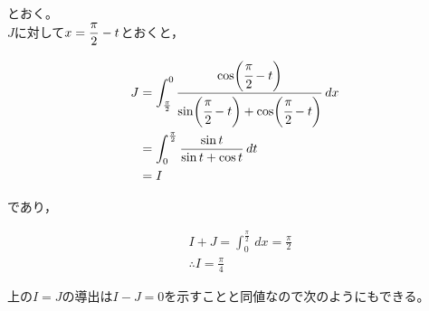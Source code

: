 \documentclass[a4paper]{ltjsarticle}
\begin{document}
\begin{intprob}
\end{intprob}

\begin{intprob}
\end{intprob}

\begin{intprob}
  とおく。 \\
  $J$に対して$\displaystyle x=\frac{\pi}{2}-t$とおくと，

  \begin{fleqn}[20pt]
    \begin{align*}
      J
      &= \int_{\frac{\pi}{2}}^{0}\frac{\cos \biggl( \cfrac{\pi}{2} - t \biggr)}{\sin \biggl( \cfrac{\pi}{2} - t \biggr) + \cos \biggl( \cfrac{\pi}{2} - t \biggr)} \,dx \\
      &= \int_{0}^{\frac{\pi}{2}} \frac{\sin t}{\sin t + \cos t} \,dt \\
      &= I
    \end{align*}
  \end{fleqn}
  であり，
  \begin{fleqn}[20pt]
    \begin{align*}
      &I + J
      = \int_{0}^{\frac{\pi}{2}} \,dx = \frac{\pi}{2} \\
      &\therefore I = \frac{\pi}{4}
    \end{align*}
  \end{fleqn}
\end{intprob}

上の$I=J$の導出は$I-J=0$を示すことと同値なので次のようにもできる。\\
\begin{other*}
\end{other*}
\end{document}
